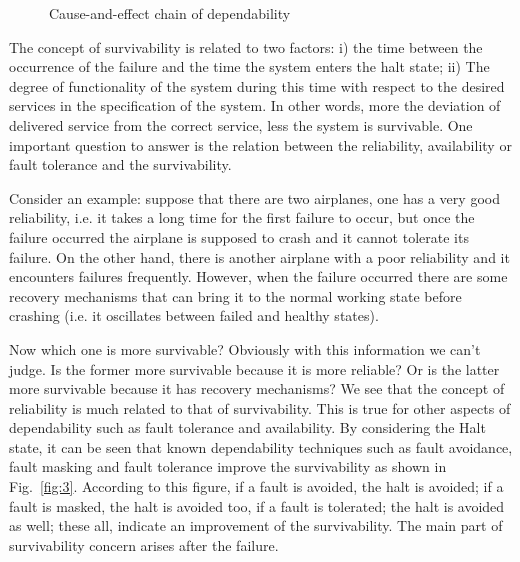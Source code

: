 \documentclass[onecolumn,conference]{IEEEtran}
\begin{document}
    \begin{figure}[htbp]
        \centering
        \caption{Cause-and-effect chain of dependability}
        \label{fig:2}
    \end{figure}

    The concept of survivability is related to two factors: i) the time between the occurrence of the failure and the time the system enters the halt state; ii) The degree of functionality of the system during this time with respect to the desired services in the specification of the system. In other words, more the deviation of delivered service from the correct service, less the system is survivable. One important question to answer is the relation between the reliability, availability or fault tolerance and the survivability.

    Consider an example: suppose that there are two airplanes, one has a very good reliability, i.e. it takes a long time for the first failure to occur, but once the failure occurred the airplane is supposed to crash and it cannot tolerate its failure. On the other hand, there is another airplane with a poor reliability and it encounters failures frequently. However, when the failure occurred there are some recovery mechanisms that can bring it to the normal working state before crashing (i.e. it oscillates between failed and healthy states).

    Now which one is more survivable? Obviously with this information we can't judge. Is the former more survivable because it is more reliable? Or is the latter more survivable because it has recovery mechanisms? We see that the concept of reliability is much related to that of survivability. This is true for other aspects of dependability such as fault tolerance and availability. By considering the Halt state, it can be seen that known dependability techniques such as fault avoidance, fault masking and fault tolerance improve the survivability as shown in Fig.~\ref{fig:3}. According to this figure, if a fault is avoided, the halt is avoided; if a fault is masked, the halt is avoided too, if a fault is tolerated; the halt is avoided as well; these all, indicate an improvement of the survivability. The main part of survivability concern arises after the failure.
\end{document}
